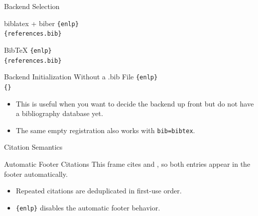 \documentclass[10pt]{beamer}
\begin{document}
\begin{frame}{Backend Selection}
\begin{block}{biblatex + biber}
\texttt{\string\usetheme[bib=biblatex]\{enlp\}}\\
\texttt{\string\enlpusebibresource\{references.bib\}}
\end{block}
\begin{block}{BibTeX}
\texttt{\string\usetheme[bib=bibtex]\{enlp\}}\\
\texttt{\string\enlpusebibresource\{references.bib\}}
\end{block}
\begin{block}{Backend Initialization Without a .bib File}
\texttt{\string\usetheme[bib=biblatex]\{enlp\}}\\
\texttt{\string\enlpusebibresource\{\}}
\end{block}
\begin{itemize}
  \item This is useful when you want to decide the backend up front but do not have a bibliography database yet.
  \item The same empty registration also works with \texttt{bib=bibtex}.
\end{itemize}
\end{frame}

\begin{frame}{Citation Semantics}
\end{frame}

\begin{frame}{Automatic Footer Citations}
  This frame cites \cite{doe2025} and , so both entries appear in the footer automatically.
  \begin{itemize}
    \item Repeated citations are deduplicated in first-use order.
    \item \texttt{\string\usetheme[autocitefooter=false]\{enlp\}} disables the automatic footer behavior.
  \end{itemize}
\end{frame}
\end{document}
